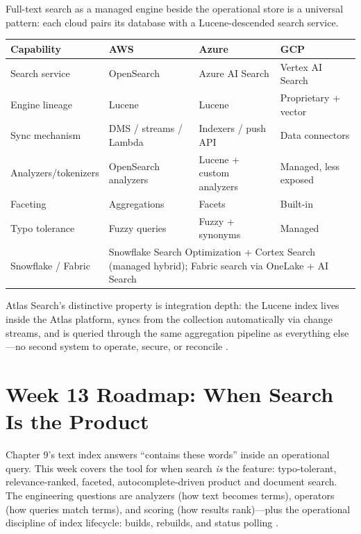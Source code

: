 \begin{crosscloud}
Full-text search as a managed engine beside the operational store is a universal pattern: each cloud pairs its database with a Lucene-descended search service.

\vspace{2mm}
{\footnotesize
\begin{tabular}{@{}p{2.9cm}p{3.0cm}p{3.0cm}p{3.0cm}@{}} 
\toprule
\textbf{Capability} & \textbf{AWS} & \textbf{Azure} & \textbf{GCP} \\
\midrule
Search service & OpenSearch & Azure AI Search & Vertex AI Search \\
Engine lineage & Lucene & Lucene & Proprietary + vector \\
Sync mechanism & DMS / streams / Lambda & Indexers / push API & Data connectors \\
Analyzers/tokenizers & OpenSearch analyzers & Lucene + custom analyzers & Managed, less exposed \\
Faceting & Aggregations & Facets & Built-in \\
Typo tolerance & Fuzzy queries & Fuzzy + synonyms & Managed \\
\addlinespace
Snowflake / Fabric & \multicolumn{3}{l}{Snowflake Search Optimization + Cortex Search (managed hybrid); Fabric search via OneLake + AI Search} \\
\bottomrule
\end{tabular}}

\vspace{1mm}
Atlas Search's distinctive property is integration depth: the Lucene index lives inside the Atlas platform, syncs from the collection automatically via change streams, and is queried through the same aggregation pipeline as everything else---no second system to operate, secure, or reconcile \cite{mongodbAtlasSearchDocs,apacheLuceneRepo}.
\end{crosscloud}

\section{Week 13 Roadmap: When Search Is the Product}
Chapter 9's text index answers ``contains these words'' inside an operational query. This week covers the tool for when search \emph{is} the feature: typo-tolerant, relevance-ranked, faceted, autocomplete-driven product and document search. The engineering questions are analyzers (how text becomes terms), operators (how queries match terms), and scoring (how results rank)---plus the operational discipline of index lifecycle: builds, rebuilds, and status polling \cite{mongodbAtlasSearchDocs}.

